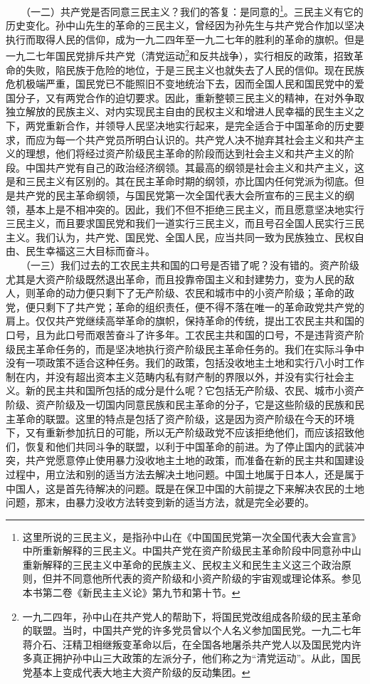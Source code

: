 \documentclass[cn,11pt,chinese]{elegantbook}
\begin{document}
　　（一二）共产党是否同意三民主义？我们的答复：是同意的\footnote[20]{ 这里所说的三民主义，是指孙中山在《中国国民党第一次全国代表大会宣言》中所重新解释的三民主义。中国共产党在资产阶级民主革命阶段中同意孙中山重新解释的三民主义中革命的民族主义、民权主义和民生主义这三个政治原则，但并不同意他所代表的资产阶级和小资产阶级的宇宙观或理论体系。参见本书第二卷《新民主主义论》第九节和第十节。}。三民主义有它的历史变化。孙中山先生的革命的三民主义，曾经因为孙先生与共产党合作加以坚决执行而取得人民的信仰，成为一九二四年至一九二七年的胜利的革命的旗帜。但是一九二七年国民党排斥共产党（清党运动\footnote[21]{ 一九二四年，孙中山在共产党人的帮助下，将国民党改组成各阶级的民主革命的联盟。当时，中国共产党的许多党员曾以个人名义参加国民党。一九二七年蒋介石、汪精卫相继叛变革命以后，在全国各地屠杀共产党人以及国民党内许多真正拥护孙中山三大政策的左派分子，他们称之为“清党运动”。从此，国民党基本上变成代表大地主大资产阶级的反动集团。}和反共战争），实行相反的政策，招致革命的失败，陷民族于危险的地位，于是三民主义也就失去了人民的信仰。现在民族危机极端严重，国民党已不能照旧不变地统治下去，因而全国人民和国民党中的爱国分子，又有两党合作的迫切要求。因此，重新整顿三民主义的精神，在对外争取独立解放的民族主义、对内实现民主自由的民权主义和增进人民幸福的民生主义之下，两党重新合作，并领导人民坚决地实行起来，是完全适合于中国革命的历史要求，而应为每一个共产党员所明白认识的。共产党人决不抛弃其社会主义和共产主义的理想，他们将经过资产阶级民主革命的阶段而达到社会主义和共产主义的阶段。中国共产党有自己的政治经济纲领。其最高的纲领是社会主义和共产主义，这是和三民主义有区别的。其在民主革命时期的纲领，亦比国内任何党派为彻底。但是共产党的民主革命纲领，与国民党第一次全国代表大会所宣布的三民主义的纲领，基本上是不相冲突的。因此，我们不但不拒绝三民主义，而且愿意坚决地实行三民主义，而且要求国民党和我们一道实行三民主义，而且号召全国人民实行三民主义。我们认为，共产党、国民党、全国人民，应当共同一致为民族独立、民权自由、民生幸福这三大目标而奋斗。\\
　　（一三）我们过去的工农民主共和国的口号是否错了呢？没有错的。资产阶级尤其是大资产阶级既然退出革命，而且投靠帝国主义和封建势力，变为人民的敌人，则革命的动力便只剩下了无产阶级、农民和城市中的小资产阶级；革命的政党，便只剩下了共产党；革命的组织责任，便不得不落在唯一的革命政党共产党的肩上。仅仅共产党继续高举革命的旗帜，保持革命的传统，提出工农民主共和国的口号，且为此口号而艰苦奋斗了许多年。工农民主共和国的口号，不是违背资产阶级民主革命任务的，而是坚决地执行资产阶级民主革命任务的。我们在实际斗争中没有一项政策不适合这种任务。我们的政策，包括没收地主土地和实行八小时工作制在内，并没有超出资本主义范畴内私有财产制的界限以外，并没有实行社会主义。新的民主共和国所包括的成分是什么呢？它包括无产阶级、农民、城市小资产阶级、资产阶级及一切国内同意民族和民主革命的分子，它是这些阶级的民族和民主革命的联盟。这里的特点是包括了资产阶级，这是因为资产阶级在今天的环境下，又有重新参加抗日的可能，所以无产阶级政党不应该拒绝他们，而应该招致他们，恢复和他们共同斗争的联盟，以利于中国革命的前进。为了停止国内的武装冲突，共产党愿意停止使用暴力没收地主土地的政策，而准备在新的民主共和国建设过程中，用立法和别的适当方法去解决土地问题。中国土地属于日本人，还是属于中国人，这是首先待解决的问题。既是在保卫中国的大前提之下来解决农民的土地问题，那末，由暴力没收方法转变到新的适当方法，就是完全必要的。\\
\end{document}
